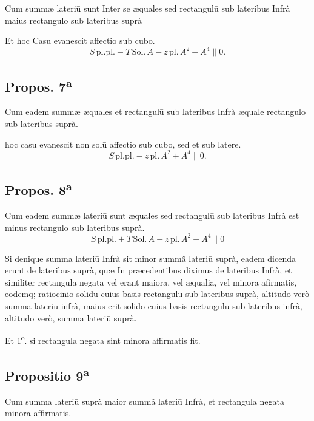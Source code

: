 \documentclass[11pt,a4paper]{article}
\begin{document}
Cum summæ lateriū sunt Inter se æquales sed rectangulū sub lateribus Infrà maius rectangulo sub lateribus suprà

Et hoc Casu evanescit affectio sub cubo.
\[ S\,\mathrm{pl.pl.} - T\,\mathrm{Sol.}\,A - z\,\mathrm{pl.}\,A^{2} + A^{4} \parallel 0. \]

\subsection*{Propos. 7\textsuperscript{a}}

Cum eadem summæ æquales et rectangulū sub lateribus Infrà æquale rectangulo sub lateribus suprà.

hoc casu evanescit non solū affectio sub cubo, sed et sub latere.
\[ S\,\mathrm{pl.pl.} - z\,\mathrm{pl.}\,A^{2} + A^{4} \parallel 0. \]

\subsection*{Propos. 8\textsuperscript{a}}

Cum eadem summæ lateriū sunt æquales sed rectangulū sub lateribus Infrà est minus rectangulo sub lateribus suprà.
\[ S\,\mathrm{pl.pl.} + T\,\mathrm{Sol.}\,A - z\,\mathrm{pl.}\,A^{2} + A^{4} \parallel 0 \]

Si denique summa lateriū Infrà sit minor summâ lateriū suprà, eadem dicenda erunt de lateribus suprà, quæ In præcedentibus diximus de lateribus Infrà, et similiter rectangula negata vel erant maiora, vel æqualia, vel minora afirmatis, eodemq; ratiocinio solidū cuius basis rectangulū sub lateribus suprà, altitudo verò summa lateriū infrà, maius erit solido cuius basis rectangulū sub lateribus infrà, altitudo verò, summa lateriū suprà.


Et 1\textsuperscript{o}. si rectangula negata sint minora affirmatis fit.

\subsection*{Propositio 9\textsuperscript{a}}

Cum summa lateriū suprà maior summâ lateriū Infrà, et rectangula negata minora affirmatis.
\end{document}
